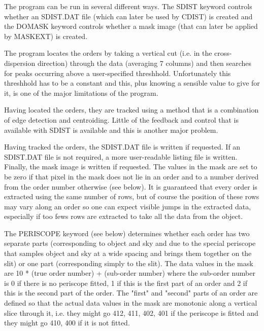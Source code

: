 \begin{description}
\begin{description}
\begin{terminalv}
    The program can be run in several different ways. The SDIST
    keyword controls whether an SDIST.DAT file (which can later be
    used by CDIST) is created and the DOMASK keyword controls whether
    a mask image (that can later be applied by MASKEXT) is created.

    The program locates the orders by taking a vertical cut (i.e. in the
    cross-dispersion direction) through the data (averaging 7 columns)
    and then searches for peaks occurring above a user-specified
    threshhold.  Unfortunately this threshhold has to be a constant
    and this, plus knowing a sensible value to give for it, is one of
    the major limitations of the program.

    Having located the orders, they are tracked using a method that is
    a combination of edge detection and centroiding. Little of the
    feedback and control that is available with SDIST is available and
    this is another major problem.

    Having tracked the orders, the SDIST.DAT file is written if
    requested.  If an SDIST.DAT file is not required, a more
    user-readable listing file is written. Finally, the mask image is
    written if requested.  The values in the mask are set to be zero
    if that pixel in the mask does not lie in an order and to a number
    derived from the order number otherwise (see below). It is
    guaranteed that every order is extracted using the same number of
    rows, but of course the position of these rows may vary along an
    order so one can expect visible jumps in the extracted data,
    especially if too fews rows are extracted to take all the data
    from the object.

    The PERISCOPE keyword (see below) determines whether each order
    has two separate parts (corresponding to object and sky and due to
    the special periscope that samples object and sky at a wide
    spacing and brings them together on the slit) or one part
    (corresponding simply to the slit).  The data values in the mask
    are 10 * (true order number) + (sub-order number) where the
    sub-order number is 0 if there is no periscope fitted, 1 if this
    is the first part of an order and 2 if this is the second part of
    the order. The "first" and "second" parts of an order are defined
    so that the actual data values in the mask are monotonic along a
    vertical slice through it, i.e. they might go 412, 411, 402, 401 if
    the periscope is fitted and they might go 410, 400 if it is not
    fitted.


\end{terminalv}
\end{description}
\end{description}
